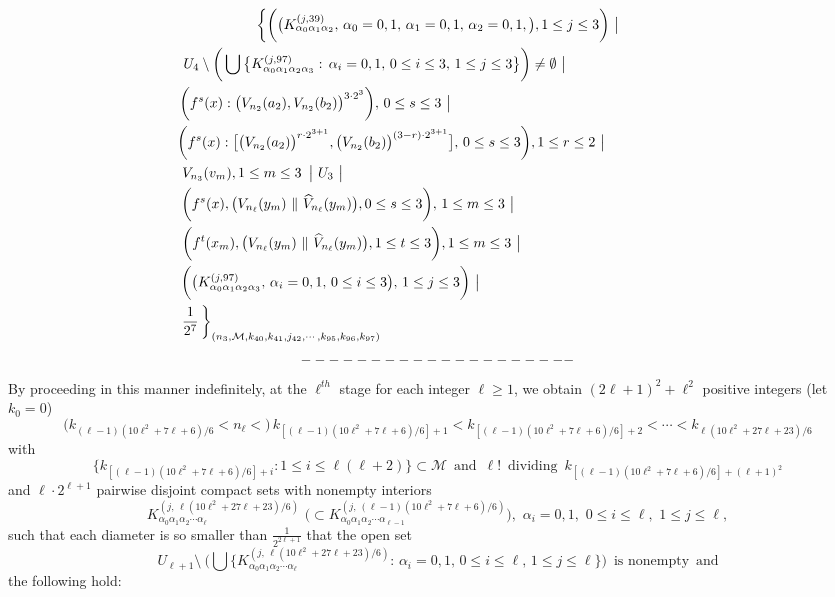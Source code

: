 \documentclass[12pt]{article}
\newcommand{\al}{\alpha}
\begin{document}
\begin{multline*}
$$
\bigg\{ \bigg(\big(K_{\al_0\al_1\al_2}^{(j,39)}, \, \al_0 = 0, 1, \, \al_1 = 0, 1, \, \al_2 = 0, 1, \big), 1 \le j \le 3 \bigg) \,\, \big| \\ 
\,U_4 \setminus \bigg( \bigcup \big\{ K_{\al_0\al_1\al_2\al_3}^{(j,97)}: \, \al_i = 0, 1, \, 0 \le i \le 3, \, 1 \le j \le 3 \big\} \bigg) \ne \emptyset \,\, \big| \qquad \qquad\qquad\quad\quad\,\,\,\,\,\,\, \\ 
\quad\quad \bigg(f^s(x) : \big(V_{n_2}(a_2), V_{n_2}(b_2)\big)^{3 \cdot 2^3}\bigg), \, 0 \le s \le 3 \,\, \big| \qquad\qquad\qquad\qquad\qquad\qquad\qquad\qquad\qquad\quad\,\,\, \\
\,\, \bigg(f^s(x) : \big[\big(V_{n_2}(a_2)\big)^{r \cdot 2^{3+1}}, \big(V_{n_2}(b_2)\big)^{(3-r) \cdot 2^{3+1}}\big], \, 0 \le s \le 3\bigg), 1 \le r \le 2 \,\, \big| \qquad\qquad\quad\quad\,\,\,\,\,\, \\  
\, V_{n_3}(v_m), 1 \le m \le 3 \,\,\, \big| \,\, U_3 \,\, \big| \,\qquad\qquad\qquad\qquad\qquad\qquad\qquad\qquad\qquad\qquad\qquad\qquad\quad \\
\bigg(f^{s}(x), \big(V_{n_\ell}(y_m) \,\, \| \,\, \widehat V_{n_\ell}(y_m)\big), 0 \le s \le 3\bigg), \, 1 \le m \le 3 \,\, \big| \qquad\qquad\qquad\qquad\qquad\qquad\,\,\,\,\, \\ 
\bigg(f^t(x_m), \big(V_{n_\ell}(y_m) \,\, \| \,\, \widehat V_{n_\ell}(y_m)\big), 1 \le t \le 3 \bigg), 1 \le m \le 3 \,\, \big| \qquad\qquad\qquad\qquad\qquad\qquad\,\, \\ 
\,\,\,\, \bigg(\big(K_{\al_0\al_1\al_2\al_3}^{(j,97)}, \, \al_i = 0,1, \, 0 \le i \le 3 \big), \, 1 \le j \le 3\bigg) \,\, \big| \qquad\qquad\qquad\qquad\qquad\qquad\qquad\qquad \\
\frac 1{2^7} \, \bigg\}_{(n_3, \mathcal M, k_{40}, k_{41}, j_{42}, \cdots, k_{95}, k_{96}, k_{97})} \quad\quad\,\,\qquad\qquad\qquad\qquad\qquad\qquad\qquad\qquad\qquad\qquad
\end{multline*}
$$--------------------\vspace{.1in}$$
\indent By proceeding in this manner indefinitely, at the $\ell^{th}$ stage for each integer $\ell \ge 1$, we obtain $(2\ell+1)^2+\ell^2$ positive integers (let $k_0 = 0$)
$$
\big(k_{(\ell-1)(10\ell^2+7\ell+6)/6} < n_\ell <\big) \, k_{[(\ell-1)(10\ell^2+7\ell+6)/6]+1} < k_{[(\ell-1)(10\ell^2+7\ell+6)/6]+2} < \cdots < k_{\ell(10\ell^2+27\ell+23)/6}
$$ 
with 
$$
\big\{ k_{[(\ell-1)(10\ell^2+7\ell+6)/6]+i}: 1 \le i \le \ell(\ell+2) \big\} \subset \mathcal M \,\,\, \text{and} \,\,\, {\ell}! \,\,\, \text{dividing} \,\,\, k_{[(\ell-1)(10\ell^2+7\ell+6)/6]+(\ell+1)^2} 
$$ 
and $\ell \cdot 2^{\ell+1}$ pairwise disjoint compact sets with nonempty interiors
$$
K_{\al_0\al_1\al_2\cdots \al_\ell}^{(j, \,\ell(10\ell^2+27\ell+23)/6)} \,\, \big(\subset K_{\al_0\al_1\al_2\cdots \al_{\ell-1}}^{(j,\, (\ell-1)(10\ell^2+7\ell+6)/6)}\big), \,\, \al_i = 0, 1, \,\, 0 \le i \le \ell, \,\, 1 \le j \le \ell,
$$ 
such that each diameter is so smaller than $\frac 1{2^{2\ell+1}}$ that the open set 
$$
U_{\ell+1} \setminus \ \bigg( \bigcup \big\{ K_{\al_0\al_1\al_2\cdots \al_\ell}^{(j,\,\ell(10\ell^2+27\ell+23)/6)}: \, \al_i = 0, 1, \, 0 \le i \le \ell, \, 1 \le j \le \ell \big\} \bigg) \,\,\, \text{is nonempty} \,\,\, \text{and}
$$
the following hold:
\end{document}
